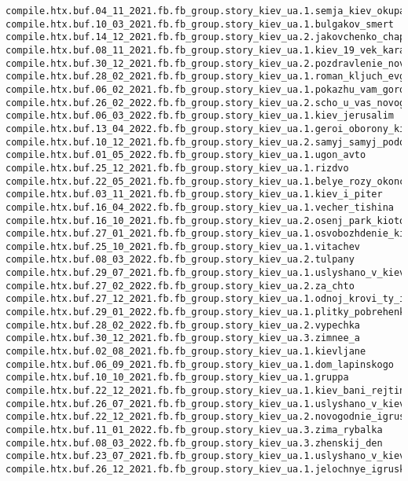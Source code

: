 \begin{Verbatim}
compile.htx.buf.04_11_2021.fb.fb_group.story_kiev_ua.1.semja_kiev_okupacia
compile.htx.buf.10_03_2021.fb.fb_group.story_kiev_ua.1.bulgakov_smert
compile.htx.buf.14_12_2021.fb.fb_group.story_kiev_ua.2.jakovchenko_chaplin
compile.htx.buf.08_11_2021.fb.fb_group.story_kiev_ua.1.kiev_19_vek_karaim_kupec_kogen
compile.htx.buf.30_12_2021.fb.fb_group.story_kiev_ua.2.pozdravlenie_novyj_god_rizdvo
compile.htx.buf.28_02_2021.fb.fb_group.story_kiev_ua.1.roman_kljuch_evgenij_iljin
compile.htx.buf.06_02_2021.fb.fb_group.story_kiev_ua.1.pokazhu_vam_gorod
compile.htx.buf.26_02_2022.fb.fb_group.story_kiev_ua.2.scho_u_vas_novogo
compile.htx.buf.06_03_2022.fb.fb_group.story_kiev_ua.1.kiev_jerusalim
compile.htx.buf.13_04_2022.fb.fb_group.story_kiev_ua.1.geroi_oborony_kieva
compile.htx.buf.10_12_2021.fb.fb_group.story_kiev_ua.2.samyj_samyj_podol
compile.htx.buf.01_05_2022.fb.fb_group.story_kiev_ua.1.ugon_avto
compile.htx.buf.25_12_2021.fb.fb_group.story_kiev_ua.1.rizdvo
compile.htx.buf.22_05_2021.fb.fb_group.story_kiev_ua.1.belye_rozy_okonchanie
compile.htx.buf.03_11_2021.fb.fb_group.story_kiev_ua.1.kiev_i_piter
compile.htx.buf.16_04_2022.fb.fb_group.story_kiev_ua.1.vecher_tishina
compile.htx.buf.16_10_2021.fb.fb_group.story_kiev_ua.2.osenj_park_kioto
compile.htx.buf.27_01_2021.fb.fb_group.story_kiev_ua.1.osvobozhdenie_kieva
compile.htx.buf.25_10_2021.fb.fb_group.story_kiev_ua.1.vitachev
compile.htx.buf.08_03_2022.fb.fb_group.story_kiev_ua.2.tulpany
compile.htx.buf.29_07_2021.fb.fb_group.story_kiev_ua.1.uslyshano_v_kieve_8
compile.htx.buf.27_02_2022.fb.fb_group.story_kiev_ua.2.za_chto
compile.htx.buf.27_12_2021.fb.fb_group.story_kiev_ua.1.odnoj_krovi_ty_i_ja
compile.htx.buf.29_01_2022.fb.fb_group.story_kiev_ua.1.plitky_pobrehenki_60_70_rokiv
compile.htx.buf.28_02_2022.fb.fb_group.story_kiev_ua.2.vypechka
compile.htx.buf.30_12_2021.fb.fb_group.story_kiev_ua.3.zimnee_a
compile.htx.buf.02_08_2021.fb.fb_group.story_kiev_ua.1.kievljane
compile.htx.buf.06_09_2021.fb.fb_group.story_kiev_ua.1.dom_lapinskogo
compile.htx.buf.10_10_2021.fb.fb_group.story_kiev_ua.1.gruppa
compile.htx.buf.22_12_2021.fb.fb_group.story_kiev_ua.1.kiev_bani_rejting
compile.htx.buf.26_07_2021.fb.fb_group.story_kiev_ua.1.uslyshano_v_kieve_7
compile.htx.buf.22_12_2021.fb.fb_group.story_kiev_ua.2.novogodnie_igrushki
compile.htx.buf.11_01_2022.fb.fb_group.story_kiev_ua.3.zima_rybalka
compile.htx.buf.08_03_2022.fb.fb_group.story_kiev_ua.3.zhenskij_den
compile.htx.buf.23_07_2021.fb.fb_group.story_kiev_ua.1.uslyshano_v_kieve_4
compile.htx.buf.26_12_2021.fb.fb_group.story_kiev_ua.1.jelochnye_igruski

\end{Verbatim}
